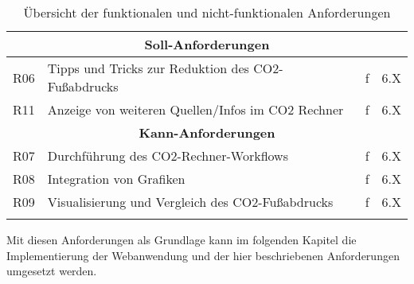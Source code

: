 \begin{longtable}{|c|l|c|c|}
    \multicolumn{4}{|c|}{\textbf{Soll-Anforderungen}}                                    \\ \hline

    R06                  & Tipps und Tricks zur Reduktion des CO2-Fußabdrucks & f  & 6.X \\ \hline
    R11                  & Anzeige von weiteren Quellen/Infos im CO2 Rechner  & f  & 6.X \\ \hline

    \multicolumn{4}{|c|}{\textbf{Kann-Anforderungen}}                                    \\ \hline

    R07                  & Durchführung des CO2-Rechner-Workflows             & f  & 6.X \\ \hline
    R08                  & Integration von Grafiken                           & f  & 6.X \\ \hline
    R09                  & Visualisierung und Vergleich des CO2-Fußabdrucks   & f  & 6.X \\ \hline
    \caption{Übersicht der funktionalen und nicht-funktionalen Anforderungen}
    \\
\end{longtable}


Mit diesen Anforderungen als Grundlage kann im folgenden Kapitel die Implementierung der Webanwendung und der hier beschriebenen Anforderungen umgesetzt werden.
